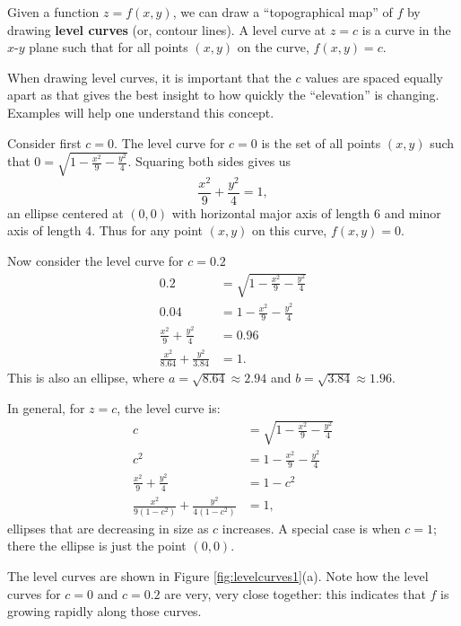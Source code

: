 Given a function $z=f(x,y)$, we can draw a ``topographical map'' of $f$ by drawing \textbf{level curves} (or, contour lines). A level curve at $z=c$ is a curve in the $x$-$y$ plane such that for all points $(x,y)$ on the curve, $f(x,y) = c$. 

When drawing level curves, it is important that the $c$ values are spaced equally apart as that gives the best insight to how quickly the ``elevation'' is changing. Examples will help one understand this concept.\\

{Consider first $c=0$. The level curve for $c=0$ is the set of all points $(x,y)$ such that $0=\sqrt{1-\frac{x^2}9-\frac{y^2}4}$. Squaring both sides  gives us
$$\frac{x^2}9+\frac{y^2}4=1,$$ an ellipse centered at $(0,0)$ with horizontal major axis of length 6 and minor axis of length 4. Thus for any point $(x,y)$ on this curve, $f(x,y) = 0$.

Now consider the level curve for $c=0.2$
\begin{align*}
0.2 &= \sqrt{1-\frac{x^2}9-\frac{y^2}4}\\
0.04 &= 1-\frac{x^2}9-\frac{y^2}4\\
\frac{x^2}9+\frac{y^2}4 &=0.96\\
\frac{x^2}{8.64}+\frac{y^2}{3.84} &=1.
\end{align*}
This is also an ellipse, where $a = \sqrt{8.64}\approx 2.94$ and $b=\sqrt{3.84}\approx 1.96$.

In general, for $z=c$, the level curve is:
\begin{align*}
c &= \sqrt{1-\frac{x^2}9-\frac{y^2}4}\\
c^2 &= 1-\frac{x^2}9-\frac{y^2}4\\
\frac{x^2}9+\frac{y^2}4 &=1-c^2\\
\frac{x^2}{9(1-c^2)}+\frac{y^2}{4(1-c^2)} &=1,
\end{align*}
ellipses that are decreasing in size as $c$ increases. A special case is when $c=1$; there the ellipse is just the point $(0,0)$. 

The level curves are shown in Figure \ref{fig:levelcurves1}(a). Note how the level curves for $c=0$ and $c=0.2$ are very, very close together: this indicates that $f$ is growing rapidly along those curves.

}
